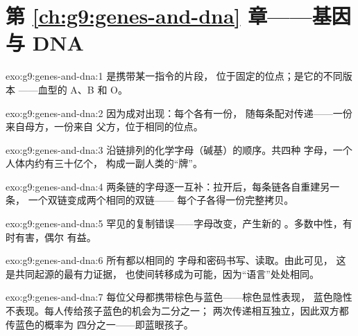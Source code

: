\section*{第 \ref{ch:g9:genes-and-dna} 章——基因与 DNA}

\begin{solution}{exo:g9:genes-and-dna:1}
是携带某一指令的片段，
位于固定的位点；是它的不同版本
——血型的 A、B 和 O。
\end{solution}

\begin{solution}{exo:g9:genes-and-dna:2}
因为成对出现：每个各有一份，
随每条配对传递——一份来自母方，一份来自
父方，位于相同的位点。
\end{solution}

\begin{solution}{exo:g9:genes-and-dna:3}
沿链排列的化学字母（碱基）的顺序。共四种
字母，一个人体内约有三十亿个，
构成一副人类的“牌”。
\end{solution}

\begin{solution}{exo:g9:genes-and-dna:4}
两条链的字母逐一互补：拉开后，每条链各自重建另一条，
一个双链变成两个相同的双链——
每个子各得一份完整拷贝。
\end{solution}

\begin{solution}{exo:g9:genes-and-dna:5}
罕见的复制错误——字母改变，产生新的
。多数中性，有时有害，偶尔
有益。
\end{solution}

\begin{solution}{exo:g9:genes-and-dna:6}
所有都以相同的
 字母和密码书写、读取。由此可见，
这是共同起源的最有力证据，
也使间转移成为可能，因为“语言”处处相同。
\end{solution}

\begin{solution}{exo:g9:genes-and-dna:7}
每位父母都携带棕色与蓝色——棕色显性表现，
蓝色隐性不表现。每人传给孩子蓝色的机会为二分之一；
两次传递相互独立，因此双方都传蓝色的概率为
四分之一——即蓝眼孩子。
\end{solution}

